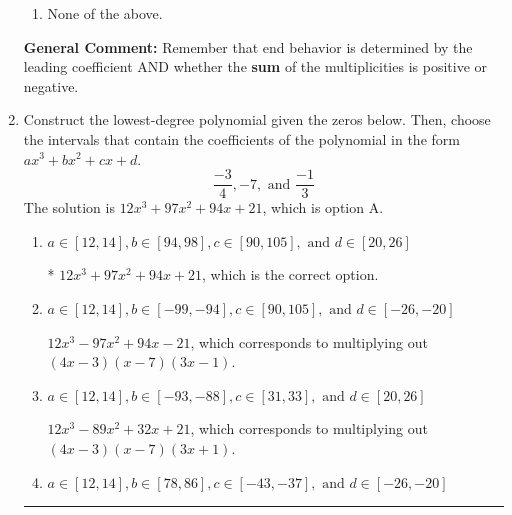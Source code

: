 \documentclass{extbook}[14pt]
\newcommand{\litem}[1]{\item #1

\rule{\textwidth}{0.4pt}}
\begin{document}
\begin{enumerate}
{\begin{enumerate}[label=\Alph*.]
\item None of the above.\end{enumerate}
\textbf{General Comment:} Remember that end behavior is determined by the leading coefficient AND whether the \textbf{sum} of the multiplicities is positive or negative.
}
\litem{
Construct the lowest-degree polynomial given the zeros below. Then, choose the intervals that contain the coefficients of the polynomial in the form $ax^3+bx^2+cx+d$.
\[ \frac{-3}{4}, -7, \text{ and } \frac{-1}{3} \]The solution is \( 12x^{3} +97 x^{2} +94 x + 21 \), which is option A.\begin{enumerate}[label=\Alph*.]
\item \( a \in [12, 14], b \in [94, 98], c \in [90, 105], \text{ and } d \in [20, 26] \)

* $12x^{3} +97 x^{2} +94 x + 21$, which is the correct option.
\item \( a \in [12, 14], b \in [-99, -94], c \in [90, 105], \text{ and } d \in [-26, -20] \)

$12x^{3} -97 x^{2} +94 x -21$, which corresponds to multiplying out $(4x -3)(x -7)(3x -1)$.
\item \( a \in [12, 14], b \in [-93, -88], c \in [31, 33], \text{ and } d \in [20, 26] \)

$12x^{3} -89 x^{2} +32 x + 21$, which corresponds to multiplying out $(4x -3)(x -7)(3x + 1)$.
\item \( a \in [12, 14], b \in [78, 86], c \in [-43, -37], \text{ and } d \in [-26, -20] \)


\end{enumerate}}
\end{enumerate}
\end{document}
